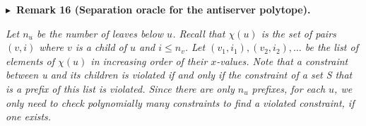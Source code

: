 



\par\medskip\noindent\textbf{
$\blacktriangleright$ Remark 16 (Separation oracle for the antiserver polytope).
}\par



\emph{Let $n_{u}$ be the number of leaves below $u$. Recall that $\chi(u)$ is the set of pairs $(v,i)$ where $v$ is a child of $u$ and $i\leq n_{v}$. Let $(v_{1},i_{1}),(v_{2},i_{2}),\dots$ be the list of elements of $\chi(u)$ in increasing order of their $x$-values. Note that a constraint between u and its children is violated if and only if the constraint of a set S that is a prefix of this list is violated. Since there are only $n_{u}$ prefixes, for each $u$, we only need to check polynomially many constraints to find a violated constraint, if one exists.}\par






\par



